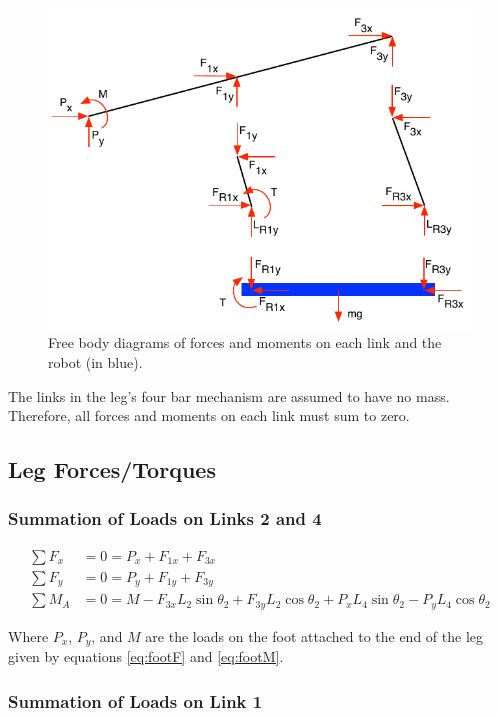 \documentclass[letterpaper]{article}
\begin{document}
\begin{figure}[htb]
	\centering
	\includegraphics{FB.pdf}
	\caption{Free body diagrams of forces and moments on each link and the robot (in blue).}
	\label{fig:FB}
\end{figure}

The links in the leg's four bar mechanism are assumed to have no mass. Therefore, all forces and moments on each link must sum to zero.
\subsection{Leg Forces/Torques}
\subsubsection{Summation of Loads on Links 2 and 4}

\begin{align}
	\sum F_x &= 0 = P_x + F_{1x} + F_{3x} \\
	\sum F_y &= 0 = P_y + F_{1y} + F_{3y} \\
	\sum M_A &= 0 = M - F_{3x} L_2 \sin \theta_2 + F_{3y} L_2 \cos \theta_2 + P_x L_4 \sin \theta_2 - P_y L_4 \cos \theta_2
\end{align}

\noindent Where $P_x$, $P_y$, and $M$ are the loads on the foot attached to the end of the leg given by equations \ref{eq:footF} and \ref{eq:footM}.

\subsubsection{Summation of Loads on Link 1}
\end{document}

